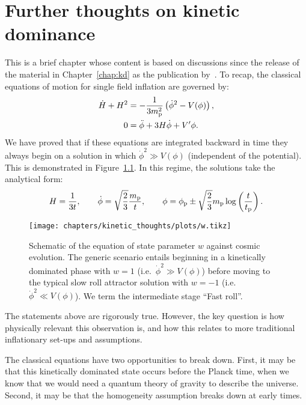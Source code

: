 \chapter{Further thoughts on kinetic dominance}
\label{chap:kt}

This is a brief chapter whose content is based on discussions since the release of the material in Chapter~\ref{chap:kd} as the publication by~\cite{Handley+2014}.
To recap, the classical equations of motion for single field inflation are
governed by:
%
\begin{align}
  \dot{H} + H^2 
  &= - \frac{1}{3m_{\mathrm{p}}^2}\left( \dot{\phi}^2 - V(\phi)\right),
  \label{eqn:kt:raychaudhuri}
  \\
  0 &= \ddot{\phi} + 3H\dot\phi + V^\prime{\phi}.
  \label{eqn:kt:kleingordon}
\end{align}
%
We have proved that if these equations are integrated backward in time
they always begin on a solution in which \(\dot\phi^2\gg V(\phi)\)
(independent of the potential). This is demonstrated in
Figure~\ref{fig:kt:w}. In this regime, the solutions take the analytical
form:
\begin{equation}
  H = \frac{1}{3t},
  \qquad 
  \dot{\phi} = \sqrt{\frac 2 3}\frac{m_{\mathrm{p}}}{t}, 
  \qquad 
  \phi = \phi_{\mathrm{p}} \pm \sqrt{\frac 2 3}m_{\mathrm{p}} \log\left( \frac t {t_{\mathrm{p}}} \right).
\end{equation}
\begin{figure}[tp]
  \texttt{[image: chapters/kinetic\_thoughts/plots/w.tikz]}
  \caption{%
    Schematic of the equation of state parameter \(w\) against cosmic
    evolution. The generic scenario entails beginning in a kinetically
    dominated phase with \(w=1\) (i.e.\ \(\dot{\phi}^2\gg V(\phi)\))
    before moving to the typical slow roll attractor solution with
    \(w=-1\) (i.e.\ \(\dot{\phi}^2 \ll V(\phi)\)). We term the
    intermediate stage ``Fast roll''.\label{fig:kt:w}
  }
\end{figure}

The statements above are rigorously true. However, the key question is how physically relevant this observation is, and how this relates to more traditional inflationary set-ups and assumptions.

The classical equations have two opportunities to break down. First, it may be that this kinetically dominated state occurs before the Planck time, when we know that we would need a quantum theory of gravity to describe the universe. Second, it may be that the homogeneity assumption breaks down at early times.

